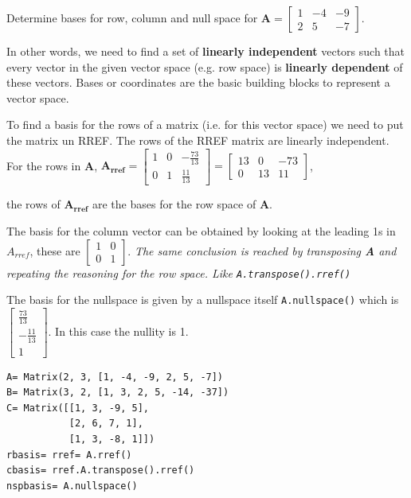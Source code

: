 Determine bases for row, column and null space for
$\mathbf{A} = \left[\begin{matrix}1 & -4 & -9\\2 & 5 & -7\end{matrix}\right]$.

In other words, we need to find a set of \textbf{linearly independent} vectors such that
every vector in the given vector space (e.g. row space) is \textbf{linearly dependent} of these
vectors. Bases or coordinates are the basic building blocks to represent a vector
space.

To find a basis for the rows of a matrix (i.e. for this vector space) we need to
put the matrix un RREF. The rows of the RREF matrix are linearly independent. For
the rows in \textbf{A},
$\mathbf{A_{rref}} =
\left[\begin{matrix}1 & 0 & - \frac{73}{13}\\0 & 1 & \frac{11}{13}\end{matrix}\right] =
\left[\begin{matrix}13 & 0 & -73\\0 & 13 & 11\end{matrix}\right]$,

the rows of $\mathbf{A_{rref}}$ are the bases for the row space of $\mathbf{A}$.

The basis for the column vector can be obtained by looking at the leading 1s in
$A_{rref}$, these are $\left[\begin{matrix}1 & 0\\0 & 1\end{matrix}\right]$. \emph{
The same conclusion is reached by transposing \textbf{A} and repeating the reasoning
for the row space. Like \texttt{A.transpose().rref()}}

The basis for the nullspace is given by a nullspace itself \texttt{A.nullspace()}
which is $\left[\begin{matrix}\frac{73}{13}\\- \frac{11}{13}\\1\end{matrix}\right]$.
In this case the nullity is 1.

\begin{verbatim}
A= Matrix(2, 3, [1, -4, -9, 2, 5, -7])
B= Matrix(3, 2, [1, 3, 2, 5, -14, -37])
C= Matrix([[1, 3, -9, 5],
           [2, 6, 7, 1],
           [1, 3, -8, 1]])
rbasis= rref= A.rref()
cbasis= rref.A.transpose().rref()
nspbasis= A.nullspace()
\end{verbatim}